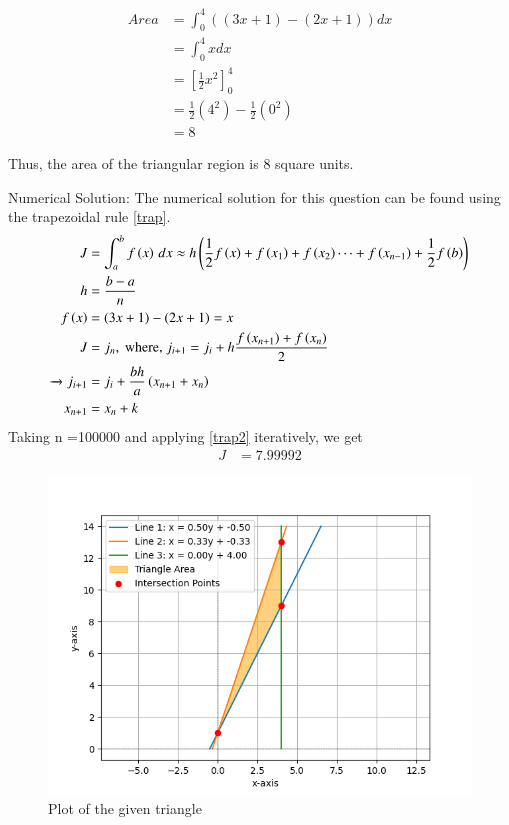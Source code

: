 \documentclass[journal]{IEEEtran}
\begin{document}
	\begin{align}
	Area &= \int_0^4 ((3x+1) - (2x+1)) dx \\ &=\int_0^4 x dx \\&= \left[ \frac{1}{2}x^2 \right]_0^4 \\&= \frac{1}{2}(4^2) - \frac{1}{2}(0^2) \\&= 8
	\end{align}
	
	Thus, the area of the triangular region is 8 square units.

	Numerical Solution:\newline
	The numerical solution for this question can be found using the trapezoidal rule \eqref{trap}.
	\begin{align}
		J &= \int_a^b f\left(x\right)\, dx \approx h\left(\frac{1}{2}f\left(x\right) + f\left(x_1\right) + f\left(x_2\right) \cdots + f\left(x_{n-1}\right) + \frac{1}{2}f\left(b\right)\right) \label{trap}\\
		h &= \frac{b-a}{n}\\
				f\left(x\right) &= (3x+1) - (2x+1) = x\\
		J &= j_n, \text{ where, } j_{i + 1} = j_i + h\frac{f\left(x_{n+1}\right) + f\left(x_n\right)}{2}\\ 
		\xrightarrow{} j_{i + 1} &= j_i + \frac{bh}{a}\left( x_{n+1} +  x_n\right)\label{trap2}\\
		x_{n+1} &= x_n + k
	\end{align}
	Taking n =100000 and applying \eqref{trap2} iteratively, we get \begin{align}
		J &= 7.99992
	\end{align}
	\begin{figure}[h!]
		\centering
		\includegraphics[width=\columnwidth]{figs/fig1.png}
		\caption{Plot of the given triangle}
		\label{stemplot}
	\end{figure}
\end{document}
